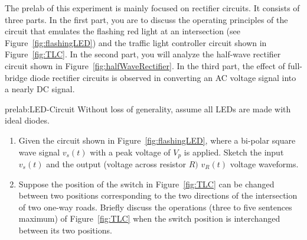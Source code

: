 The prelab of this experiment is mainly focused on rectifier circuits. It consists of three parts. In the first part, you are to discuss the operating principles of the circuit that emulates the flashing red light at an intersection (see Figure~\ref{fig:flashingLED}) and the traffic light controller circuit shown in Figure~\ref{fig:TLC}. In the second part, you will analyze the half-wave rectifier circuit shown in Figure~\ref{fig:halfWaveRectifier}. In the third part, the effect of full-bridge diode rectifier circuits is observed in converting an AC voltage signal into a nearly DC signal. %
%
\begin{prelab}{prelab:LED-Circuit}
 Without loss of generality, assume all LEDs are made with ideal diodes. 
 
\begin{enumerate}
    \item Given the circuit shown in Figure~\ref{fig:flashingLED}, where a bi-polar square wave signal $v_s(t)$ with a peak voltage of $V_p$ is applied.  Sketch the input $v_s(t)$ and the output (voltage across resistor $R)$ $v_R(t)$ voltage waveforms.
      \begin{center}
      \end{center}      
      \item Suppose the position of the switch in Figure~\ref{fig:TLC} can be changed between two positions corresponding to the two directions of the intersection of two one-way roads. Briefly discuss the operations (three to five sentences maximum) of Figure~\ref{fig:TLC} when the switch position is interchanged between its two positions.     
\end{enumerate}
\end{prelab}


